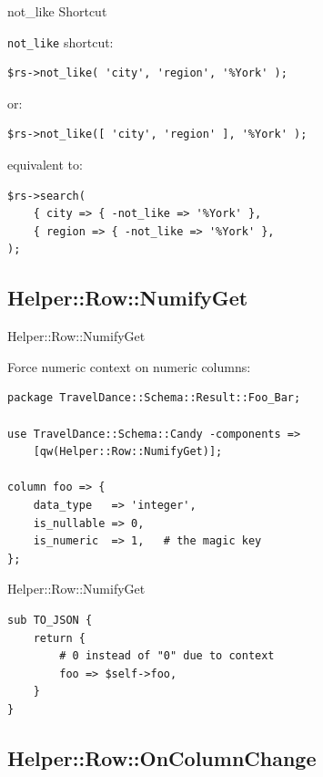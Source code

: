 
\begin{frame}[fragile]{not\_like Shortcut}

\verb|not_like| shortcut:

\begin{lstlisting}
$rs->not_like( 'city', 'region', '%York' );
\end{lstlisting}

or:

\begin{lstlisting}
$rs->not_like([ 'city', 'region' ], '%York' );
\end{lstlisting}

equivalent to:

\begin{lstlisting}
$rs->search(
    { city => { -not_like => '%York' },
    { region => { -not_like => '%York' },
);

\end{lstlisting}
\end{frame}

\subsection{Helper::Row::NumifyGet}

\begin{frame}[fragile]{Helper::Row::NumifyGet}

Force numeric context on numeric columns:

\begin{lstlisting}
package TravelDance::Schema::Result::Foo_Bar;

use TravelDance::Schema::Candy -components =>
    [qw(Helper::Row::NumifyGet)];

column foo => {
    data_type   => 'integer',
    is_nullable => 0,
    is_numeric  => 1,   # the magic key
};
\end{lstlisting}
\end{frame}

\begin{frame}[fragile]{Helper::Row::NumifyGet}
\begin{lstlisting}
sub TO_JSON {
    return {
        # 0 instead of "0" due to context
        foo => $self->foo,  
    }
}
\end{lstlisting}
\end{frame}

\subsection{Helper::Row::OnColumnChange}

